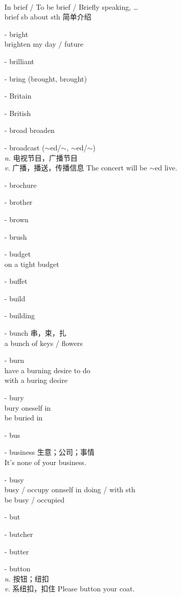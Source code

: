 \documentclass[../../book.tex]{subfiles}
\begin{document}
\begin{multicols}{2}
\begin{itemize}
\\In brief / To be brief / Briefly speaking, \ldots
\\brief sb about sth 简单介绍
\item[-] bright
\\brighten my day / future
\item[-] brilliant
\item[-] bring (brought, brought)
\item[-] Britain
\item[-] British
\item[-] broad \phantom{a} broaden
\item[-] broadcast ($\sim$ed/$\sim$, $\sim$ed/$\sim$)
\\\emph{n.} 电视节目，广播节目
\\\emph{v.} 广播，播送，传播信息 The concert will be $\sim$ed live.
\item[-] brochure
\item[-] brother
\item[-] brown
\item[-] brush
\item[-] budget
\\on a tight budget
\item[-] buffet
\item[-] build
\item[-] building
\item[-] bunch 串，束，扎
\\a bunch of keys / flowers
\item[-] burn
\\have a burning desire to do
\\with a buring desire
\item[-] bury
\\bury oneself in
\\be buried in
\item[-] bus
\item[-] business 生意；公司；事情
\\It\textquoteright s none of your business.
\item[-] busy
\\busy / occupy onnself in doing / with sth
\\be busy / occupied
\item[-] but
\item[-] butcher
\item[-] butter
\item[-] button
\\\emph{n.} 按钮；纽扣
\\\emph{v.} 系纽扣，扣住 Please button your coat.

\end{itemize}
\end{multicols}
\end{document}
